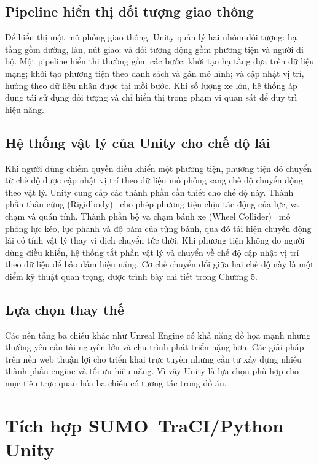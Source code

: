 ﻿\documentclass[../DoAn.tex]{subfiles}
\begin{document}
\subsection{Pipeline hiển thị đối tượng giao thông}

Để hiển thị một mô phỏng giao thông, Unity quản lý hai nhóm đối tượng: hạ tầng
gồm đường, làn, nút giao; và đối tượng động gồm phương tiện và người đi bộ. Một
pipeline hiển thị thường gồm các bước: khởi tạo hạ tầng dựa trên dữ liệu mạng;
khởi tạo phương tiện theo danh sách và gán mô hình; và cập nhật vị trí, hướng
theo dữ liệu nhận được tại mỗi bước. Khi số lượng xe lớn, hệ thống áp dụng tái sử
dụng đối tượng và chỉ hiển thị trong phạm vi quan sát để duy trì hiệu năng.

\subsection{Hệ thống vật lý của Unity cho chế độ lái}

Khi người dùng chiếm quyền điều khiển một phương tiện, phương tiện đó chuyển từ
chế độ được cập nhật vị trí theo dữ liệu mô phỏng sang chế độ chuyển động theo
vật lý. Unity cung cấp các thành phần cần thiết cho chế độ này. Thành phần thân
cứng (Rigidbody)~\cite{unity_rigidbody} cho phép phương tiện chịu tác động của lực, va chạm và quán
tính. Thành phần bộ va chạm bánh xe (Wheel Collider)~\cite{unity_wheelcollider} mô phỏng lực kéo, lực phanh
và độ bám của từng bánh, qua đó tái hiện chuyển động lái có tính vật lý thay vì
dịch chuyển tức thời. Khi phương tiện không do người dùng điều khiển, hệ thống
tắt phần vật lý và chuyển về chế độ cập nhật vị trí theo dữ liệu để bảo đảm hiệu
năng. Cơ chế chuyển đổi giữa hai chế
độ này là một điểm kỹ thuật quan trọng, được trình bày chi tiết trong Chương 5.

\subsection{Lựa chọn thay thế}

Các nền tảng ba chiều khác như Unreal Engine có khả năng đồ họa mạnh nhưng thường
yêu cầu tài nguyên lớn và chu trình phát triển nặng hơn. Các giải pháp trên nền
web thuận lợi cho triển khai trực tuyến nhưng cần tự xây dựng nhiều thành phần
engine và tối ưu hiệu năng. Vì vậy Unity là lựa chọn phù hợp cho mục tiêu trực
quan hóa ba chiều có tương tác trong đồ án.

\section{Tích hợp SUMO--TraCI/Python--Unity}
\end{document}
